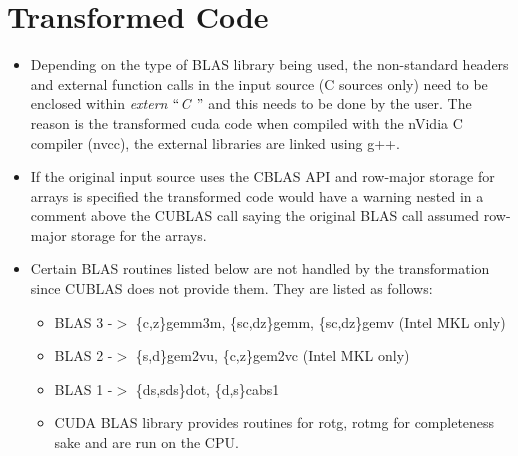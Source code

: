 \documentclass[12pt,a4paper]{article}
\begin{document}
\section{Transformed Code}
\begin{itemize}
  \item Depending on the type of BLAS library being used, the non-standard headers and
external function calls in the input source (C sources only) need to be enclosed within
\textit{extern $``$C $"$} and this needs to be done by the user. The reason is the transformed
cuda code when compiled with the nVidia C compiler (nvcc), the external libraries are
linked using g++.

\item If the original input source uses the CBLAS API and row-major storage
for arrays is specified the transformed code would have a warning nested in a comment above the
CUBLAS call saying the original BLAS call assumed row-major storage for the arrays.

  \item Certain BLAS routines listed below are not handled by the transformation since CUBLAS
does not provide them. They are listed as follows:
  \begin{itemize}
  \item BLAS 3 -$>$ \{c,z\}gemm3m, \{sc,dz\}gemm, \{sc,dz\}gemv (Intel MKL only)
  \item BLAS 2 -$>$ \{s,d\}gem2vu, \{c,z\}gem2vc (Intel MKL only)
  \item BLAS 1 -$>$ \{ds,sds\}dot, \{d,s\}cabs1 
  \item CUDA BLAS library provides routines for {rotg, rotmg}
 \newline for completeness sake and are run on the CPU.
  \end{itemize}

\end{itemize}
\end{document}
